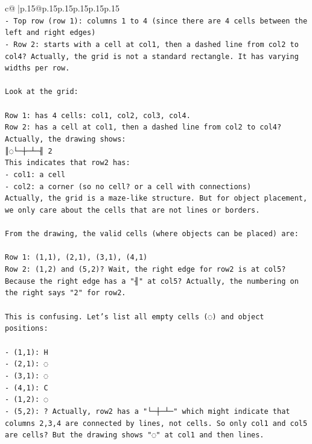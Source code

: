 \documentclass{article}
\begin{document}
{\begin{supertabular}{c@{$\;$}|p{.15\linewidth}@{}p{.15\linewidth}p{.15\linewidth}p{.15\linewidth}p{.15\linewidth}p{.15\linewidth}}
{{{\\ 
\texttt{{-} Top row (row 1): columns 1 to 4 (since there are 4 cells between the left and right edges)} \\
\texttt{{-} Row 2: starts with a cell at col1, then a dashed line from col2 to col4? Actually, the grid is not a standard rectangle. It has varying widths per row.} \\
\\ 
\texttt{Look at the grid:} \\
\\ 
\texttt{Row 1: has 4 cells: col1, col2, col3, col4.} \\
\texttt{Row 2: has a cell at col1, then a dashed line from col2 to col4? Actually, the drawing shows:} \\
\texttt{║◌└─┼─┴─╢ 2} \\
\texttt{This indicates that row2 has:} \\
\texttt{{-} col1: a cell} \\
\texttt{{-} col2: a corner (so no cell? or a cell with connections)} \\
\texttt{Actually, the grid is a maze{-}like structure. But for object placement, we only care about the cells that are not lines or borders.} \\
\\ 
\texttt{From the drawing, the valid cells (where objects can be placed) are:} \\
\\ 
\texttt{Row 1: (1,1), (2,1), (3,1), (4,1)} \\
\texttt{Row 2: (1,2) and (5,2)? Wait, the right edge for row2 is at col5? Because the right edge has a "╢" at col5? Actually, the numbering on the right says "2" for row2.} \\
\\ 
\texttt{This is confusing. Let's list all empty cells (◌) and object positions:} \\
\\ 
\texttt{{-} (1,1): H} \\
\texttt{{-} (2,1): ◌} \\
\texttt{{-} (3,1): ◌} \\
\texttt{{-} (4,1): C} \\
\texttt{{-} (1,2): ◌} \\
\texttt{{-} (5,2): ? Actually, row2 has a "└─┼─┴─" which might indicate that columns 2,3,4 are connected by lines, not cells. So only col1 and col5 are cells? But the drawing shows "◌" at col1 and then lines.} \\
}}}
\end{supertabular}}
\end{document}
